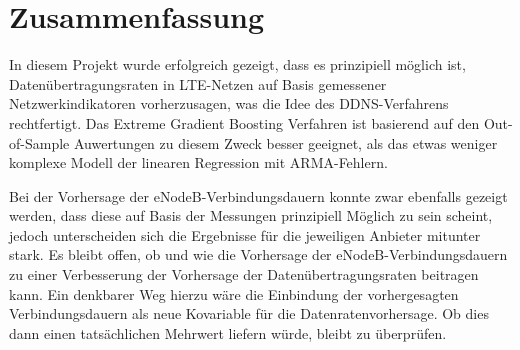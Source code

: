 \section{Zusammenfassung}

In diesem Projekt wurde erfolgreich gezeigt, dass es prinzipiell m\"oglich ist, Daten\"ubertragungsraten in LTE-Netzen
auf Basis gemessener Netzwerkindikatoren vorherzusagen, was die Idee des DDNS-Verfahrens rechtfertigt.
Das Extreme Gradient Boosting Verfahren ist basierend auf den Out-of-Sample Auwertungen zu diesem Zweck besser geeignet,
als das etwas weniger komplexe Modell der linearen Regression mit ARMA-Fehlern.

Bei der Vorhersage der eNodeB-Verbindungsdauern konnte zwar ebenfalls gezeigt werden, dass diese auf Basis der Messungen
prinzipiell M\"oglich zu sein scheint, jedoch unterscheiden sich die Ergebnisse f\"ur die jeweiligen Anbieter mitunter stark.
Es bleibt offen, ob und wie die Vorhersage der eNodeB-Verbindungsdauern zu einer Verbesserung der Vorhersage der
Daten\"ubertragungsraten beitragen kann. Ein denkbarer Weg hierzu w\"are die Einbindung der vorhergesagten Verbindungsdauern
als neue Kovariable f\"ur die Datenratenvorhersage. Ob dies dann einen tats\"achlichen Mehrwert liefern w\"urde, bleibt zu \"uberpr\"ufen.
